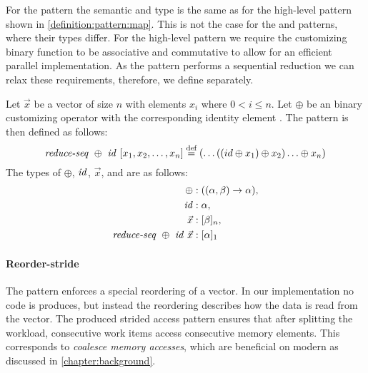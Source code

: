 For the \mapSeq pattern the semantic and type is the same as for the high-level \map pattern shown in \autoref{definition:pattern:map}.
This is not the case for the \reduceSeq and \reduce patterns, where their types differ.
For the high-level \reduce pattern we require the customizing binary function to be associative and commutative to allow for an efficient parallel implementation.
As the \reduceSeq pattern performs a sequential reduction we can relax these requirements, therefore, we define \reduceSeq separately.
\begin{definition}
  \label{definition:pattern:reduceSeq}
  Let $\vec{x}$ be a vector of size $n$ with elements $x_i$ where $0 < i \leq n$.
  Let $\oplus$ be an binary customizing operator with the corresponding identity element \id.
  The \reduceSeq pattern is then defined as follows:
  \begin{equation*}
    \text{\textit{reduce-seq}}\ \oplus\ \text{\textit{id}}\ [x_1, x_2, \dots, x_n]
      \stackrel{\textrm{\scriptsize def}}{=} (\dots((id \oplus x_1) \oplus x_2) \ldots \oplus x_n)
  \end{equation*}
  The types of $\oplus$, $\text{\textit{id}}$, $\vec{x}$, and \reduce are as follows:
  \begin{align*}
    \oplus &: ((\alpha, \beta) \rightarrow \alpha),\\
    \text{\textit{id}} &: \alpha,\\
    \vec{x} &: [\beta]_n,\\
    \text{\textit{reduce-seq}}\ \oplus\ \text{\textit{id}}\ \vec{x} &: [\alpha]_1
  \end{align*}
\end{definition}


\paragraph{Reorder-stride}
The \reorderStride pattern enforces a special reordering of a vector.
In our implementation no code is produces, but instead the reordering describes how the data is read from the vector.
The produced strided access pattern ensures that after splitting the workload, consecutive work items access consecutive memory elements.
This corresponds to \emph{coalesce memory accesses}, which are beneficial on modern \GPUs as discussed in \autoref{chapter:background}.

